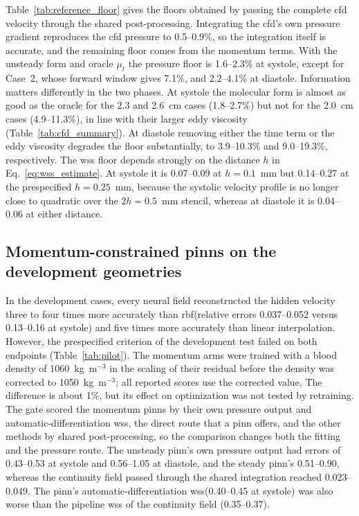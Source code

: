 \documentclass[12pt,a4paper]{article}
\newcommand{\CFD}{\ac{cfd}\xspace}
\newcommand{\PINN}{\ac{pinn}\xspace}
\newcommand{\PINNs}{\acp{pinn}\xspace}
\newcommand{\WSS}{\ac{wss}\xspace}
\newcommand{\RBF}{\ac{rbf}\xspace}
\theoremstyle{definition}
\numberwithin{equation}{section}
\begin{document}
Table~\ref{tab:reference_floor} gives the floors obtained by passing the complete \CFD velocity through the shared post-processing. Integrating the \CFD's own pressure gradient reproduces the \CFD pressure to 0.5--0.9\%, so the integration itself is accurate, and the remaining floor comes from the momentum terms. With the unsteady form and oracle $\mu_t$ the pressure floor is 1.6--2.3\% at systole, except for Case~2, whose forward window gives 7.1\%, and 2.2--4.1\% at diastole. Information matters differently in the two phases. At systole the molecular form is almost as good as the oracle for the 2.3 and 2.6~cm cases (1.8--2.7\%) but not for the 2.0~cm cases (4.9--11.3\%), in line with their larger eddy viscosity (Table~\ref{tab:cfd_summary}). At diastole removing either the time term or the eddy viscosity degrades the floor substantially, to 3.9--10.3\% and 9.0--19.3\%, respectively. The \WSS floor depends strongly on the distance $h$ in Eq.~\eqref{eq:wss_estimate}. At systole it is 0.07--0.09 at $h=0.1$~mm but 0.14--0.27 at the prespecified $h=0.25$~mm, because the systolic velocity profile is no longer close to quadratic over the $2h=0.5$~mm stencil, whereas at diastole it is 0.04--0.06 at either distance.



\subsection{Momentum-constrained \texorpdfstring{\PINNs}{PINNs} on the development geometries}
\label{sec:pilot_results}
In the development cases, every neural field reconstructed the hidden velocity three to four times more accurately than \RBF (relative errors 0.037--0.052 versus 0.13--0.16 at systole) and five times more accurately than linear interpolation. However, the prespecified criterion of the development test failed on both endpoints (Table~\ref{tab:pilot}). The momentum arms were trained with a blood density of 1060~kg~m$^{-3}$ in the scaling of their residual before the density was corrected to 1050~kg~m$^{-3}$; all reported scores use the corrected value, The difference is about 1\%, but its effect on optimization was not tested by retraining. The gate scored the momentum \PINNs by their own pressure output and automatic-differentiation \WSS, the direct route that a \PINN offers, and the other methods by shared post-processing, so the comparison changes both the fitting and the pressure route. The unsteady \PINN's own pressure output had errors of 0.43--0.53 at systole and 0.56--1.05 at diastole, and the steady \PINN's 0.51--0.90, whereas the continuity field passed through the shared integration reached 0.023--0.049. The \PINN's automatic-differentiation \WSS (0.40--0.45 at systole) was also worse than the pipeline \WSS of the continuity field (0.35--0.37).
\end{document}
